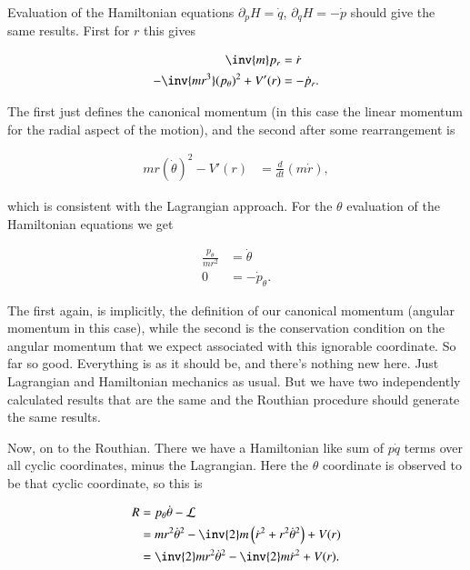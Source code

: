 Evaluation of the Hamiltonian equations $\partial_p H = \dot{q}$, $\partial_q H = -\dot{p}$ should give the same results.  First for $r$ this gives

\begin{align}\label{eqn:goldsteinRouth:32}
\inv{m} p_r &= \dot{r} \\
-\inv{m r^3} (p_\theta)^2 + V'(r) &= -\dot{p}_r.
\end{align}

The first just defines the canonical momentum (in this case the linear momentum for the radial aspect of the motion), and the second after some rearrangement is

\begin{align}\label{eqn:goldsteinRouth:33}
m r (\dot{\theta})^2 - V'(r) &= \frac{d}{dt}\left( m \dot{r} \right),
\end{align}

which is consistent with the Lagrangian approach.  For the $\theta$ evaluation of the Hamiltonian equations we get

\begin{align}\label{eqn:goldsteinRouth:34}
\frac{p_\theta}{m r^2} &= \dot{\theta} \\
0 &= -\dot{p}_\theta.
\end{align}

The first again, is implicitly, the definition of our canonical momentum (angular momentum in this case), while the second is the conservation condition on the angular momentum that we expect associated with this ignorable coordinate.  So far so good.  Everything is as it should be, and there's nothing new here.  Just Lagrangian and Hamiltonian mechanics as usual.  But we have two independently calculated results that are the same and the Routhian procedure should generate the same results.

Now, on to the Routhian.  There we have a Hamiltonian like sum of $p \dot{q}$ terms over all cyclic coordinates, minus the Lagrangian.  Here the $\theta$ coordinate is observed to be that cyclic coordinate, so this is

\begin{align*}
R 
&= p_\theta \dot{\theta} - \LL \\
&= m r^2 \dot{\theta}^2 - \inv{2} m \left(\dot{r}^2 + r^2 \dot{\theta}^2 \right) + V(r) \\
&= \inv{2} m r^2 \dot{\theta}^2 - \inv{2} m \dot{r}^2 + V(r).
\end{align*}

